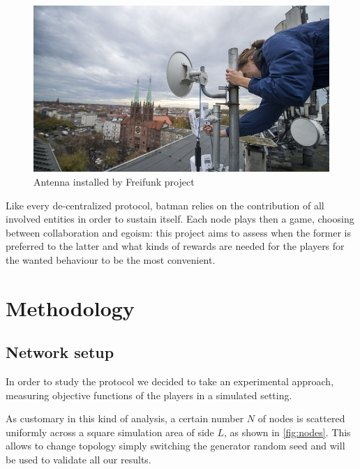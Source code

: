 \documentclass[conference]{IEEEtran}
\begin{document}
\begin{figure}[h]
  \centering
  \includegraphics[width=0.8\linewidth]{figures/batman_antenna}
  \caption{Antenna installed by Freifunk project}
  \label{fig:batman_logo}
\end{figure}

\smallskip

Like every de-centralized protocol, \gls{batman} relies on the contribution of all involved entities in order to sustain itself. Each node plays then a game, choosing between collaboration and egoism: this project aims to assess when the former is preferred to the latter and what kinds of rewards are needed for the players for the wanted behaviour to be the most convenient.

\clearpage
\section{Methodology}

\subsection{Network setup}

In order to study the protocol we decided to take an experimental approach, measuring objective functions of the players in a simulated setting.

As customary in this kind of analysis, a certain number $N$ of nodes is scattered uniformly across a square simulation area of side $L$, as shown in \autoref{fig:nodes}. This allows to change topology simply switching the generator random seed and will be used to validate all our results.
\end{document}
